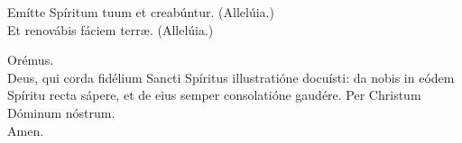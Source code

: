 \begin{multicols}{2}
	\setlength{\parskip}{0.5em}
	\V Emítte Spíritum tuum et creabúntur. (Allelúia.)\\
	\R Et renovábis fáciem terr\ae{}. (Allelúia.)

	Orémus.\\
	Deus, qui corda fidélium Sancti Spíritus illustratióne docuísti:
	da nobis in eódem Spíritu recta sápere, et de eius semper consolatióne gaudére.
	Per Christum Dóminum nóstrum.\\
	\R Amen.
\end{multicols}
